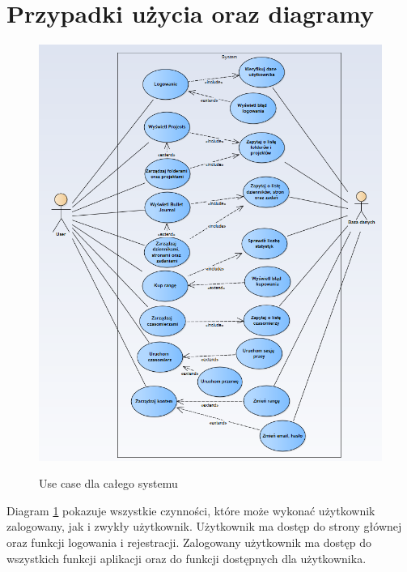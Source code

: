 \documentclass[a4paper,11pt]{report}
\begin{document}
\section{Przypadki użycia oraz diagramy}
\begin{figure}[H]
	\centering
	\includegraphics[scale=0.6]{systemusecase}\\
	\caption{Use case dla całego systemu}
	\label{fig:usecase}
\end{figure}
Diagram \ref{fig:usecase} pokazuje wszystkie czynności, które może wykonać użytkownik zalogowany, jak i zwykły użytkownik.
Użytkownik ma dostęp do strony głównej oraz funkcji logowania i rejestracji.
Zalogowany użytkownik ma dostęp do wszystkich funkcji aplikacji oraz do funkcji dostępnych dla użytkownika.
\end{document}
